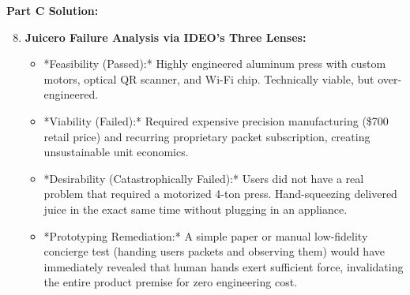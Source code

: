 \begin{solutionbox}
\textbf{Part C Solution:}
\begin{enumerate}[leftmargin=1.2em, itemsep=3pt]
    \setcounter{enumi}{7}
    \item \textbf{Juicero Failure Analysis via IDEO's Three Lenses:}
    \begin{itemize}
        \item *Feasibility (Passed):* Highly engineered aluminum press with custom motors, optical QR scanner, and Wi-Fi chip. Technically viable, but over-engineered.
        \item *Viability (Failed):* Required expensive precision manufacturing (\$700 retail price) and recurring proprietary packet subscription, creating unsustainable unit economics.
        \item *Desirability (Catastrophically Failed):* Users did not have a real problem that required a motorized 4-ton press. Hand-squeezing delivered juice in the exact same time without plugging in an appliance.
        \item *Prototyping Remediation:* A simple paper or manual low-fidelity concierge test (handing users packets and observing them) would have immediately revealed that human hands exert sufficient force, invalidating the entire product premise for zero engineering cost.
    \end{itemize}
\end{enumerate}
\end{solutionbox}
